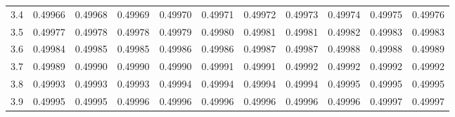 \begin{table}[H]
\begin{tabular}{r|ccccc|ccccc}
  3.4 & 0.49966 & 0.49968 & 0.49969 & 0.49970 & 0.49971 & 0.49972 & 0.49973 & 0.49974 & 0.49975 & 0.49976 \\ 
  3.5 & 0.49977 & 0.49978 & 0.49978 & 0.49979 & 0.49980 & 0.49981 & 0.49981 & 0.49982 & 0.49983 & 0.49983 \\ 
\hline
  3.6 & 0.49984 & 0.49985 & 0.49985 & 0.49986 & 0.49986 & 0.49987 & 0.49987 & 0.49988 & 0.49988 & 0.49989 \\ 
  3.7 & 0.49989 & 0.49990 & 0.49990 & 0.49990 & 0.49991 & 0.49991 & 0.49992 & 0.49992 & 0.49992 & 0.49992 \\ 
  3.8 & 0.49993 & 0.49993 & 0.49993 & 0.49994 & 0.49994 & 0.49994 & 0.49994 & 0.49995 & 0.49995 & 0.49995 \\ 
  3.9 & 0.49995 & 0.49995 & 0.49996 & 0.49996 & 0.49996 & 0.49996 & 0.49996 & 0.49996 & 0.49997 & 0.49997 \\ 
   \hline
\end{tabular}
\end{table}
